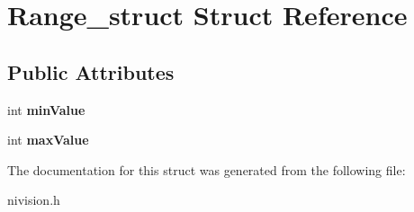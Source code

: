 \hypertarget{structRange__struct}{
\section{Range\_\-struct Struct Reference}
\label{structRange__struct}
}
\subsection*{Public Attributes}
\begin{DoxyCompactItemize}
\item 
\hypertarget{structRange__struct_aa5bfa23bf8eefefd22a42624f39ddc25}{
int {\bfseries minValue}}
\label{structRange__struct_aa5bfa23bf8eefefd22a42624f39ddc25}

\item 
\hypertarget{structRange__struct_aede24e3f197648e2cc93ef619eb2ad93}{
int {\bfseries maxValue}}
\label{structRange__struct_aede24e3f197648e2cc93ef619eb2ad93}

\end{DoxyCompactItemize}


The documentation for this struct was generated from the following file:\begin{DoxyCompactItemize}
\item 
nivision.h\end{DoxyCompactItemize}
